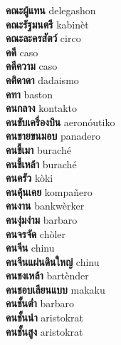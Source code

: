 \textbf{ คณะผู้แทน  } delegashon \\
\textbf{ คณะรัฐมนตรี  } kabinèt \\
\textbf{ คณะละครสัตว์  } circo \\
\textbf{ คดี  } caso \\
\textbf{ คดีความ  } caso \\
\textbf{ คติดาดา  } dadaismo \\
\textbf{ คทา  } baston \\
\textbf{ คนกลาง  } kontakto \\
\textbf{ คนขับเครื่องบิน  } aeronóutiko \\
\textbf{ คนขายขนมอบ  } panadero \\
\textbf{ คนขี้เมา  } buraché \\
\textbf{ คนขี้เหล้า  } buraché \\
\textbf{ คนครัว  } kòki \\
\textbf{ คนคุ้นเคย  } kompañero \\
\textbf{ คนงาน  } bankwèrker \\
\textbf{ คนงุ่มง่าม  } barbaro \\
\textbf{ คนจรจัด  } chòler \\
\textbf{ คนจีน  } chinu \\
\textbf{ คนจีนแผ่นดินใหญ่  } chinu \\
\textbf{ คนชงเหล้า  } bartènder \\
\textbf{ คนชอบเลียนแบบ  } makaku \\
\textbf{ คนชั้นต่ำ  } barbaro \\
\textbf{ คนชั้นนำ  } aristokrat \\
\textbf{ คนชั้นสูง  } aristokrat \\

